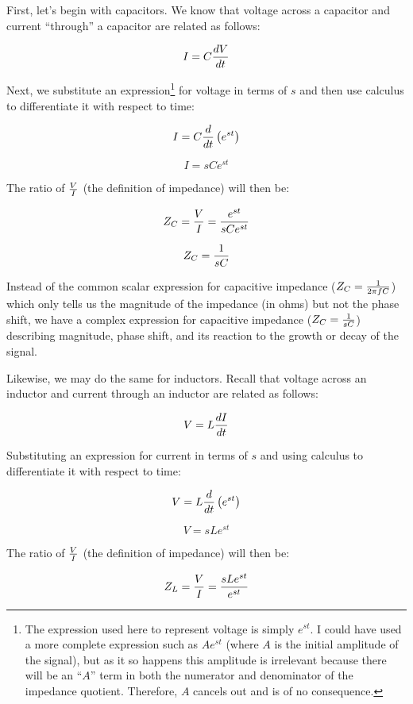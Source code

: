 First, let's begin with capacitors.  We know that voltage across a capacitor and current ``through'' a capacitor are related as follows:

$$I = C {dV \over dt}$$

Next, we substitute an expression\footnote{The expression used here to represent voltage is simply $e^{st}$.  I could have used a more complete expression such as $Ae^{st}$ (where $A$ is the initial amplitude of the signal), but as it so happens this amplitude is irrelevant because there will be an ``$A$'' term in both the numerator and denominator of the impedance quotient.  Therefore, $A$ cancels out and is of no consequence.} for voltage in terms of $s$ and then use calculus to differentiate it with respect to time: 

$$I = C {d \over dt}\left(e^{st}\right)$$

$$I = sC e^{st}$$

The ratio of $V \over I$ (the definition of impedance) will then be:  

$$Z_C = {V \over I} = {e^{st} \over sC e^{st}}$$

$$Z_C = {1 \over sC}$$

Instead of the common scalar expression for capacitive impedance ($Z_C = {1 \over {2 \pi f C}}$) which only tells us the magnitude of the impedance (in ohms) but not the phase shift, we have a complex expression for capacitive impedance ($Z_C = {1 \over sC}$) describing magnitude, phase shift, and its reaction to the growth or decay of the signal.

\vskip 10pt

\filbreak

Likewise, we may do the same for inductors.  Recall that voltage across an inductor and current through an inductor are related as follows:

$$V = L {dI \over dt}$$

Substituting an expression for current in terms of $s$ and using calculus to differentiate it with respect to time: 

$$V = L {d \over dt}\left(e^{st}\right)$$

$$V = sL e^{st}$$

The ratio of $V \over I$ (the definition of impedance) will then be:  

$$Z_L = {V \over I} = {sL e^{st} \over e^{st}}$$

